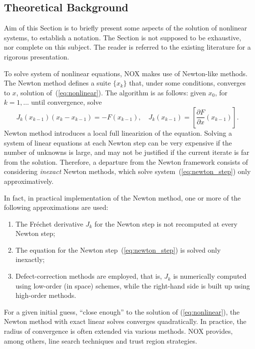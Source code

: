 
\subsection{Theoretical Background}
\label{sec:nox_theoretical}

Aim of this Section is to briefly present some aspects of the solution
of nonlinear systems, to establish a notation. The Section is not
supposed to be exhaustive, nor complete on this subject. The reader is
referred to the existing literature for a rigorous presentation.

\medskip

To solve system of nonlinear equations, NOX makes use of Newton-like methods.
The Newton method defines a suite $\{ x_k\}$ that, under some
conditions, converges to $x$, solution of~(\ref{eq:nonlinear}).
The algorithm is as follows: given $x_0$, for $k=1,\ldots$ until
convergence, solve
\begin{equation}
J_k  (x_{k-1})\left ( x_{k} - x_{k-1} \right) = 
- F(x_{k-1}),\quad
J_k  (x_{k-1}) =  \left[ \frac{ \partial F}{
        \partial x}( x_{k-1}) \right] .
\label{eq:newton_step}
\end{equation}
Newton method introduces a local full linearizion of the
equation. Solving a system of linear equations at each Newton step can
be very expensive if the number of unknowns is large, and may not be
justified if the current iterate is far from the solution. Therefore,
a departure from the Newton framework consists of considering {\em
inexact} Newton methods, which solve system~(\ref{eq:newton_step})
only approximatively.

In fact, in practical implementation of the Newton method, one or more
of the following approximations are used:
\begin{enumerate}
\item The Fr\'echet derivative $J_k$ for the Newton step is not
  recomputed at every Newton step;
\item The equation for the Newton step~(\ref{eq:newton_step}) is solved
  only inexactly;
\item Defect-correction methods are employed, that is, $J_k$ is
  numerically computed using low-order (in space) schemes, while the
  right-hand side is built up using high-order methods.
\end{enumerate}

For a given initial guess, ``close enough'' to the solution of
(\ref{eq:nonlinear}), the Newton method with exact linear solves
converges quadratically. In practice, the radius of convergence is often
extended via various methods. NOX provides, among others, line search
techniques and trust region strategies.

